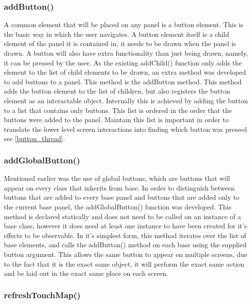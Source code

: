 \subsubsection{addButton()}

A common element that will be placed on any panel is a button element. This is the basic way in which the user navigates. A button element itself is a child element of the panel it is contained in, it needs to be drawn when the panel is drawn. A button will also have extra functionality than just being drawn, namely, it can be pressed by the user. As the existing addChild() function only adds the element to the list of child elements to be drawn, an extra method was developed to add buttons to a panel. This method is the addButton method. This method adds the button element to the list of children, but also registers the button element as an interactable object. Internally this is achieved by adding the button to a list that contains only buttons. This list is ordered in the order that the buttons were added to the panel. Maintain this list is important in order to translate the lower level screen interactions into finding which button was pressed see \ref{button_thread}.

\subsubsection{addGlobalButton()}

Mentioned earlier was the use of global buttons, which are buttons that will appear on every class that inherits from base. In order to distinguish between buttons that are added to every base panel and buttons that are added only to the current base panel, the addGlobalButton() function was developed. This method is declared statically and does not need to be called on an instance of a base class, however it does need at least one instance to have been created for it's effects to be observable. In it's simplest form, this method iterates over the list of base elements, and calls the addButton() method on each base using the supplied button argument. This allows the same button to appear on multiple screens, due to the fact that it is the exact same object, it will perform the exact same action and be laid out in the exact same place on each screen.

\subsubsection{refreshTouchMap()}

